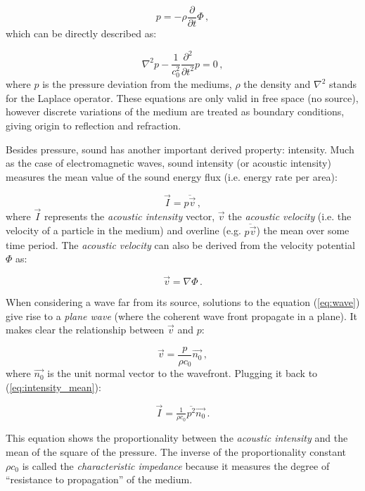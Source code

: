 \[ p =  -\rho \frac{\partial}{\partial t}\Phi\,, \]
%
which can be directly described as:

\begin{equation} \label{eq:wave}
\nabla^2 p - \frac{1}{c^2_0}\frac{\partial^2}{\partial t^2} p = 0\,,
\end{equation} 
% 
where $p$ is the pressure deviation from the mediums, $\rho$ the density and
$\nabla^2$ stands for the Laplace operator. These equations are only valid in free space (no source), however discrete variations of the medium
are treated as boundary conditions, giving origin to reflection and refraction.

Besides pressure, sound has another important derived property: intensity. Much
as the case of electromagnetic waves, sound intensity (or acoustic intensity)
measures the mean value of the sound energy flux (i.e. energy rate
per area):

\begin{equation}\label{eq:intensity_mean}
\vec{I} = \overline{p\vec{v}}\,,
\end{equation}
%
where $\vec{I}$ represents the \textit{acoustic intensity} vector, $\vec{v}$ the
\textit{acoustic velocity} (i.e. the velocity of a particle in the medium) and
overline (e.g. $\overline{p\vec{v}}$) the mean over some time period. The
\textit{acoustic velocity} can also be derived from the velocity potential $\Phi$ as:

\[ \vec{v} = \nabla \Phi\,.\]

When considering a wave far from its source, solutions to the equation
(\ref{eq:wave}) give rise to a \textit{plane wave} (where the coherent wave
front propagate in a plane). It makes clear the relationship between $\vec{v}$ and
$p$:

\[ \vec{v} = \frac{p}{\rho c_0} \vec{n_0}\,, \]
%
where $\vec{n_0}$ is the unit normal vector to the wavefront. Plugging it back
to (\ref{eq:intensity_mean}):

\begin{equation}\label{eq:intensity_pressure}
\vec{I} = \tfrac{1}{\rho c_0} \overline{p^2} \vec{n_0}\,.
\end{equation}

This equation shows the proportionality between the \textit{acoustic
intensity} and the mean of the square of the pressure. The inverse of the
proportionality constant $\rho c_0$ is called the \textit{characteristic
impedance} because it measures the degree of ``resistance to propagation'' of
the medium.

